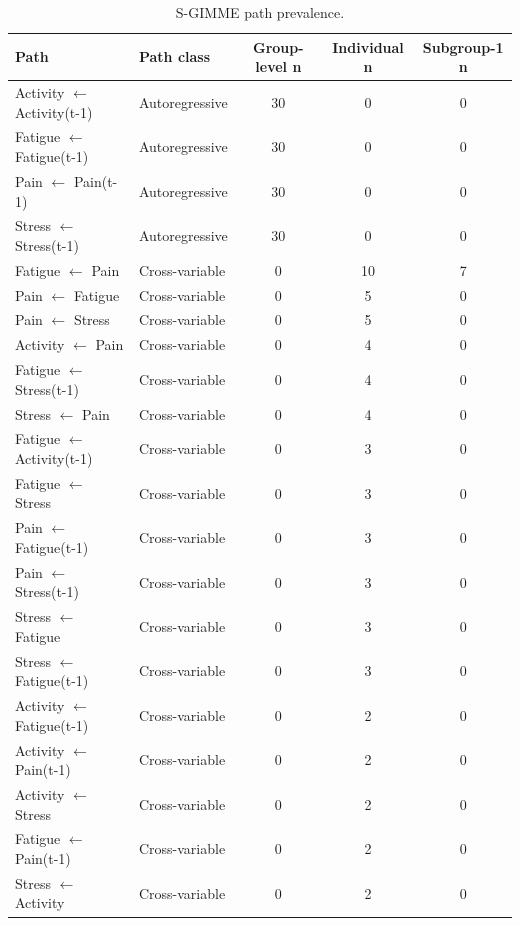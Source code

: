 \begin{table}[H]
\raggedright
\caption{S-GIMME path prevalence.}
\label{tab:sup-sgimme}
\scriptsize
\begingroup
\setlength{\tabcolsep}{4pt}
\renewcommand{\arraystretch}{1.08}
\noindent
\begin{tabular*}{\textwidth}{@{\extracolsep{\fill}}llccc@{}}
\toprule
Path & Path class & Group-level n & Individual n & Subgroup-1 n \\
\midrule
Activity $\leftarrow$ Activity(t-1) & Autoregressive & 30 & 0 & 0 \\
Fatigue $\leftarrow$ Fatigue(t-1) & Autoregressive & 30 & 0 & 0 \\
Pain $\leftarrow$ Pain(t-1) & Autoregressive & 30 & 0 & 0 \\
Stress $\leftarrow$ Stress(t-1) & Autoregressive & 30 & 0 & 0 \\
Fatigue $\leftarrow$ Pain & Cross-variable & 0 & 10 & 7 \\
Pain $\leftarrow$ Fatigue & Cross-variable & 0 & 5 & 0 \\
Pain $\leftarrow$ Stress & Cross-variable & 0 & 5 & 0 \\
Activity $\leftarrow$ Pain & Cross-variable & 0 & 4 & 0 \\
Fatigue $\leftarrow$ Stress(t-1) & Cross-variable & 0 & 4 & 0 \\
Stress $\leftarrow$ Pain & Cross-variable & 0 & 4 & 0 \\
Fatigue $\leftarrow$ Activity(t-1) & Cross-variable & 0 & 3 & 0 \\
Fatigue $\leftarrow$ Stress & Cross-variable & 0 & 3 & 0 \\
Pain $\leftarrow$ Fatigue(t-1) & Cross-variable & 0 & 3 & 0 \\
Pain $\leftarrow$ Stress(t-1) & Cross-variable & 0 & 3 & 0 \\
Stress $\leftarrow$ Fatigue & Cross-variable & 0 & 3 & 0 \\
Stress $\leftarrow$ Fatigue(t-1) & Cross-variable & 0 & 3 & 0 \\
Activity $\leftarrow$ Fatigue(t-1) & Cross-variable & 0 & 2 & 0 \\
Activity $\leftarrow$ Pain(t-1) & Cross-variable & 0 & 2 & 0 \\
Activity $\leftarrow$ Stress & Cross-variable & 0 & 2 & 0 \\
Fatigue $\leftarrow$ Pain(t-1) & Cross-variable & 0 & 2 & 0 \\
Stress $\leftarrow$ Activity & Cross-variable & 0 & 2 & 0 \\

\end{tabular*}
\end{table}
